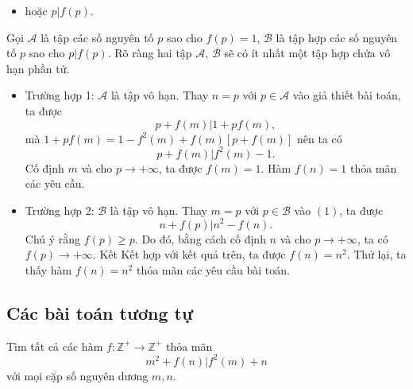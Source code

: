 \begin{bt}
{\begin{nx}
\begin{itemize}
				\item hoặc $p|f(p)$.
			\end{itemize}
			Gọi $\mathscr{A}$ là tập các số nguyên tố $p$ sao cho $f(p)=1$, $\mathscr{B}$ là tập hợp các số nguyên tố $p$ sao cho $p|f(p)$. Rõ ràng hai tập $\mathscr{A}$, $\mathscr{B}$ sẽ có ít nhất một tập hợp chứa vô hạn phần tử.
			\begin{itemize}
				\item Trường hợp 1: $\mathscr{A}$ là tập vô hạn. Thay $n=p$ với $p \in \mathscr{A}$ vào giả thiết bài toán, ta được $$p+f(m)|1+pf(m),$$ mà $1+pf(m)=1-f^2(m)+f(m)\left[ p+f(m)\right]$ nên ta có $$p+f(m)|f^2(m)-1.$$
				Cố định $m$ và cho $p \rightarrow +\infty$, ta được $f(m)=1.$ Hàm $f(n)=1$ thỏa mãn các yêu cầu.
				\item Trường hợp 2: $\mathscr{B}$ là tập vô hạn. Thay $m=p$ với $p \in \mathscr{B}$ vào $(1)$, ta được $$n+f(p)|n^2-f(n).$$
				Chú ý rằng $f(p)\geq p$. Do đó, bằng cách cố định $n$ và cho $p \rightarrow +\infty$, ta có $f(p) \rightarrow + \infty$. Kết Kết hợp với kết quả trên, ta được $f(n) =n^2$.  Thử lại, ta thấy hàm $f(n)=n^2$ thỏa mãn các yêu cầu bài toán.
			\end{itemize}
		\end{nx}
	}
\end{bt}

\subsection{Các bài toán tương tự}

\begin{bt}%
	Tìm tất cả các hàm $f\colon \mathbb{Z}^+ \rightarrow \mathbb{Z}^+$ thỏa mãn \[ m^2+f(n)| f^2(m)+n \tag{1}\] với mọi cặp số nguyên dương $m,n$.
\end{bt}

